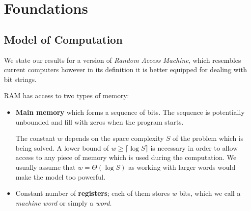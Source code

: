 \chapter{Foundations}

\section{Model of Computation}

We state our results for a version of \emph{Random Access Machine}, which resembles current computers however in its definition it is better equipped for dealing with bit strings.

RAM has access to two types of memory:
\begin{itemize}
	\item \textbf{Main memory} which forms a sequence of bits.
	The sequence is potentially unbounded and fill with zeros when the program starts.
	
	The constant $w$ depends on the space complexity $S$ of the problem which is being solved.
	A lower bound of $w \ge \lceil \log S \rceil$ is necessary in order to allow access to any piece of memory which is used during the computation.
	We usually assume that $w = \Theta(\log S)$ as working with larger words would make the model too powerful.
	\item Constant number of \textbf{registers}; each of them stores $w$ bits, which we call a \emph{machine word} or simply a \emph{word}.
\end{itemize}

